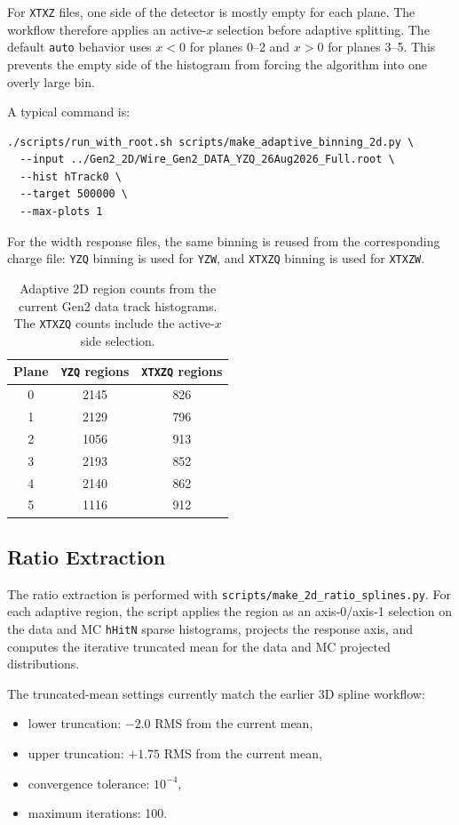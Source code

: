 \documentclass{article}
\begin{document}
For \texttt{XTXZ} files, one side of the detector is mostly empty for each plane. The workflow therefore applies an active-$x$ selection before adaptive splitting. The default \texttt{auto} behavior uses $x<0$ for planes 0--2 and $x>0$ for planes 3--5. This prevents the empty side of the histogram from forcing the algorithm into one overly large bin.

A typical command is:
\begin{verbatim}
./scripts/run_with_root.sh scripts/make_adaptive_binning_2d.py \
  --input ../Gen2_2D/Wire_Gen2_DATA_YZQ_26Aug2026_Full.root \
  --hist hTrack0 \
  --target 500000 \
  --max-plots 1
\end{verbatim}

For the width response files, the same binning is reused from the corresponding charge file: \texttt{YZQ} binning is used for \texttt{YZW}, and \texttt{XTXZQ} binning is used for \texttt{XTXZW}.

\begin{table}[H]
\centering
\caption{Adaptive 2D region counts from the current Gen2 data track histograms. The \texttt{XTXZQ} counts include the active-$x$ side selection.}
\label{tab:adaptive_2d_region_counts}
\begin{tabular}{ccc}
\toprule
Plane & \texttt{YZQ} regions & \texttt{XTXZQ} regions \\
\midrule
0 & 2145 & 826 \\
1 & 2129 & 796 \\
2 & 1056 & 913 \\
3 & 2193 & 852 \\
4 & 2140 & 862 \\
5 & 1116 & 912 \\
\bottomrule
\end{tabular}
\end{table}

\subsection{Ratio Extraction}

The ratio extraction is performed with \texttt{scripts/make\_2d\_ratio\_splines.py}. For each adaptive region, the script applies the region as an axis-0/axis-1 selection on the data and MC \texttt{hHitN} sparse histograms, projects the response axis, and computes the iterative truncated mean for the data and MC projected distributions.

The truncated-mean settings currently match the earlier 3D spline workflow:
\begin{itemize}
    \item lower truncation: $-2.0$ RMS from the current mean,
    \item upper truncation: $+1.75$ RMS from the current mean,
    \item convergence tolerance: $10^{-4}$,
    \item maximum iterations: 100.
\end{itemize}
\end{document}
